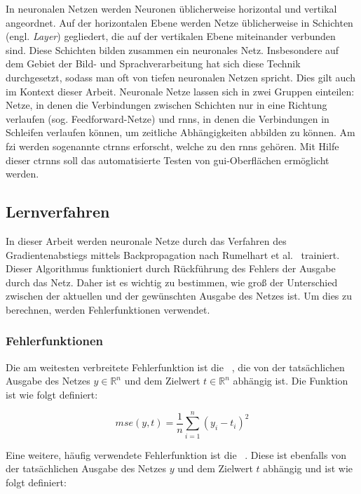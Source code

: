 In neuronalen Netzen werden Neuronen üblicherweise horizontal und vertikal angeordnet. Auf der horizontalen Ebene werden Netze üblicherweise in Schichten (engl. \emph{Layer}) gegliedert, die auf der vertikalen Ebene miteinander verbunden sind. Diese Schichten bilden zusammen ein neuronales Netz. Insbesondere auf dem Gebiet der Bild- und Sprachverarbeitung hat sich diese Technik durchgesetzt, sodass man oft von tiefen neuronalen Netzen spricht. Dies gilt auch im Kontext dieser Arbeit. Neuronale Netze lassen sich in zwei Gruppen einteilen: Netze, in denen die Verbindungen zwischen Schichten nur in eine Richtung verlaufen (sog. Feedforward-Netze) und \glspl{rnn}, in denen die Verbindungen in Schleifen verlaufen können, um zeitliche Abhängigkeiten abbilden zu können. Am \gls{fzi} werden sogenannte \glspl{ctrnn} erforscht, welche zu den \glspl{rnn} gehören. Mit Hilfe dieser \glspl{ctrnn} soll das automatisierte Testen von \gls{gui}-Oberflächen ermöglicht werden.

\subsection{Lernverfahren}
\label{subsec:lernverfahren}
In dieser Arbeit werden neuronale Netze durch das Verfahren des Gradientenabstiegs mittels Backpropagation nach Rumelhart et al.~\cite{rumelhartLearningRepresentationsBackpropagating1986} trainiert. Dieser Algorithmus funktioniert durch Rückführung des Fehlers der Ausgabe durch das Netz. Daher ist es wichtig zu bestimmen, wie groß der Unterschied zwischen der aktuellen und der gewünschten Ausgabe des Netzes ist. Um dies zu berechnen, werden Fehlerfunktionen verwendet.

\subsubsection{Fehlerfunktionen}
\label{sec:errorfunction}

Die am weitesten verbreitete Fehlerfunktion ist die ~\cite[S. 15]{yeDeepDiveKeras2022}, die von der tatsächlichen Ausgabe des Netzes $y \in \mathbb{R}^n$ und dem Zielwert $t \in \mathbb{R}^n$ abhängig ist. Die Funktion ist wie folgt definiert:

\begin{equation}
    mse(y,t) = \frac{1}{n} \sum^n_{i=1}(y_i - t_i)^2
\end{equation}

Eine weitere, häufig verwendete Fehlerfunktion ist die ~\cite{hoRealWorldWeightCrossEntropyLoss2020}. Diese ist ebenfalls von der tatsächlichen Ausgabe des Netzes $y$ und dem Zielwert $t$ abhängig und ist wie folgt definiert:

